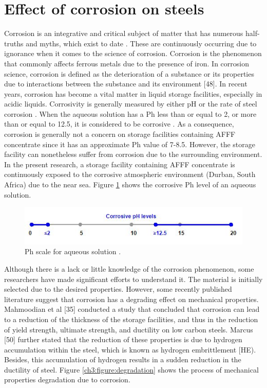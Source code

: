 \documentclass[12pt]{report}
\begin{document}
\section{Effect of corrosion on steels}
Corrosion is an integrative and critical subject of matter that has numerous half-truths and myths, which exist to date \cite{mcarthur2004engineering}. These are continuously occurring due to ignorance when it comes to the science of corrosion.  Corrosion is the phenomenon that commonly affects ferrous metals due to the presence of iron. In corrosion science, corrosion is defined as the deterioration of a substance or its properties due to interactions between the substance and its environment [48].
In recent years, corrosion has become a vital matter in liquid storage facilities, especially in acidic liquids. Corrosivity is generally measured by either pH or the rate of steel corrosion \cite{marzorati2018green}. When the aqueous solution has a Ph less than or equal to 2, or more than or equal to 12.5, it is considered to be corrosive \cite{marzorati2018green}. As a consequence, corrosion is generally not a concern on storage facilities containing AFFF concentrate since it has an approximate Ph value of 7-8.5. However, the storage facility can nonetheless suffer from corrosion due to the surrounding environment. In the present research, a storage facility containing AFFF concentrate is continuously exposed to the corrosive atmospheric environment (Durban, South Africa) due to the near sea. Figure \ref{ch3:figure:ph} shows the corrosive Ph level of an aqueous solution. 
 
\begin{figure}[H]
    \centering
    \includegraphics[width=.8\textwidth]{aqueous_solution_ph_scale.jpg}
    \caption{Ph scale for aqueous solution \cite{marzorati2018green}.}
    \label{ch3:figure:ph}
\end{figure}

Although there is a lack or little knowledge of the corrosion phenomenon, some researchers have made significant efforts to understand it. The material is initially selected due to the desired properties. However, some recently published literature suggest that corrosion has a degrading effect on mechanical properties. Mahmoodian et al [35] conducted a study that concluded that corrosion can lead to a reduction of the thickness of the storage facilities, and thus in the reduction of yield strength, ultimate strength, and ductility on low carbon steels.  Marcus [50] further stated that the reduction of these properties is due to hydrogen accumulation within the steel, which is known as hydrogen embrittlement [HE). Besides, this accumulation of hydrogen results in a sudden reduction in the ductility of steel. Figure \ref{ch3:figure:degradation} shows the process of mechanical properties degradation due to corrosion.
 
\end{document}
